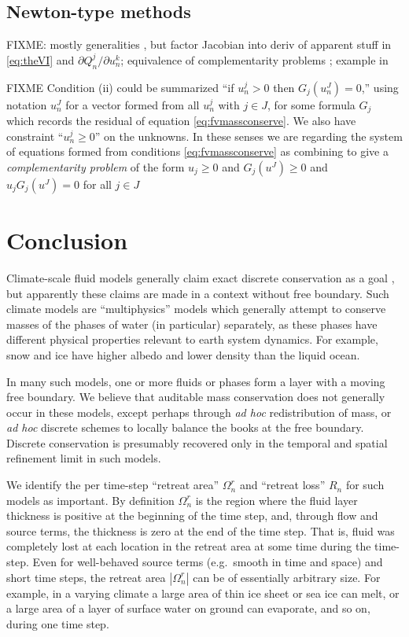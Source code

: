 \documentclass[final,onefignum]{siamart190516}
\begin{document}
\subsection{Newton-type methods} \label{subsec:newtonvi}  FIXME: mostly generalities \cite{Kelley2003}, but factor Jacobian into deriv of apparent stuff in \eqref{eq:theVI} and $\partial Q_n^j/\partial u_n^k$; equivalence of complementarity problems \cite{BensonMunson2006,BillupsMurty2000}; example in \cite{Bueler2016}

FIXME Condition (ii) could be summarized ``if $u_n^j>0$ then $G_j(u_n^J)=0$,'' using notation $u_n^J$ for a vector formed from all $u_n^j$ with $j\in J$, for some formula $G_j$ which records the residual of equation \eqref{eq:fvmassconserve}.  We also have constraint ``$u_n^j\ge 0$'' on the unknowns.  In these senses we are regarding the system of equations formed from conditions \eqref{eq:fvmassconserve} as combining to give a \emph{complementarity problem} \cite{BillupsMurty2000} of the form $u_j\ge 0$ and $G_j(u^J)\ge 0$ and $u_j G_j(u^J)=0$ for all $j\in J$


\section{Conclusion} \label{sec:conclusion}

Climate-scale fluid models generally claim exact discrete conservation as a goal \cite{Thuburn2008}, but apparently these claims are made in a context without free boundary.  Such climate models are ``multiphysics'' models which generally attempt to conserve masses of the phases of water (in particular) separately, as these phases have different physical properties relevant to earth system dynamics.  For example, snow and ice have higher albedo and lower density than the liquid ocean.

In many such models, one or more fluids or phases form a layer with a moving free boundary.  We believe that auditable mass conservation does not generally occur in these models, except perhaps through \emph{ad hoc} redistribution of mass, or \emph{ad hoc} discrete schemes to locally balance the books at the free boundary.  Discrete conservation is presumably recovered only in the temporal and spatial refinement limit in such models.

We identify the per time-step ``retreat area'' $\Omega_n^r$ and ``retreat loss'' $R_n$ for such models as important.  By definition $\Omega_n^r$ is the region where the fluid layer thickness is positive at the beginning of the time step, and, through flow and source terms, the thickness is zero at the end of the time step.  That is, fluid was completely lost at each location in the retreat area at some time during the time-step.  Even for well-behaved source terms (e.g.~smooth in time and space) and short time steps, the retreat area $|\Omega_n^r|$ can be of essentially arbitrary size.  For example, in a varying climate a large area of thin ice sheet or sea ice can melt, or a large area of a layer of surface water on ground can evaporate, and so on, during one time step.
\end{document}
